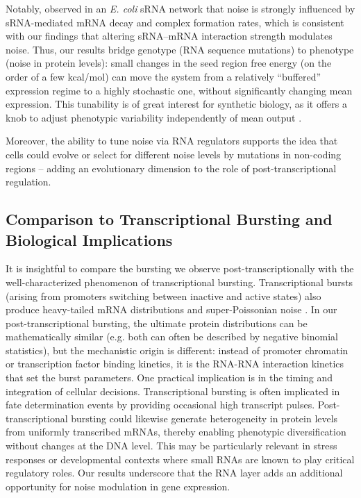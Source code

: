 Notably, \cite{ArbelGoren2016} observed in an \textit{E. coli} sRNA network that noise is strongly influenced by sRNA-mediated mRNA decay and complex formation rates, which is consistent with our findings that altering sRNA--mRNA interaction strength modulates noise. Thus, our results bridge genotype (RNA sequence mutations) to phenotype (noise in protein levels): small changes in the seed region free energy (on the order of a few kcal/mol) can move the system from a relatively ``buffered'' expression regime to a highly stochastic one, without significantly changing mean expression. This tunability is of great interest for synthetic biology, as it offers a knob to adjust phenotypic variability independently of mean output \cite{Levine2007, Mutalik2012}.

Moreover, the ability to tune noise via RNA regulators supports the idea that cells could evolve or select for different noise levels by mutations in non-coding regions -- adding an evolutionary dimension to the role of post-transcriptional regulation.

\subsection*{Comparison to Transcriptional Bursting and Biological Implications}
It is insightful to compare the bursting we observe post-transcriptionally with the well-characterized phenomenon of transcriptional bursting. Transcriptional bursts (arising from promoters switching between inactive and active states) also produce heavy-tailed mRNA distributions and super-Poissonian noise \cite{Ozbudak2002}. In our post-transcriptional bursting, the ultimate protein distributions can be mathematically similar (e.g. both can often be described by negative binomial statistics), but the mechanistic origin is different: instead of promoter chromatin or transcription factor binding kinetics, it is the RNA-RNA interaction kinetics that set the burst parameters. One practical implication is in the timing and integration of cellular decisions. Transcriptional bursting is often implicated in fate determination events by providing occasional high transcript pulses. Post-transcriptional bursting could likewise generate heterogeneity in protein levels from uniformly transcribed mRNAs, thereby enabling phenotypic diversification without changes at the DNA level. This may be particularly relevant in stress responses or developmental contexts where small RNAs are known to play critical regulatory roles. Our results underscore that the RNA layer adds an additional opportunity for noise modulation in gene expression.

